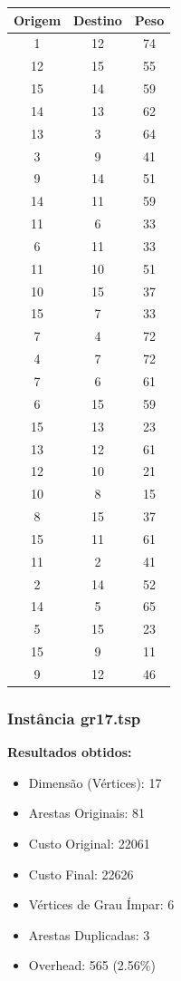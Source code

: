 \documentclass[12pt]{article}
\begin{document}
\begin{longtable}{|c|c|c|}
\hline Origem & Destino & Peso \\
\hline 1 & 12 & 74 \\
\hline 12 & 15 & 55 \\
\hline 15 & 14 & 59 \\
\hline 14 & 13 & 62 \\
\hline 13 & 3 & 64 \\
\hline 3 & 9 & 41 \\
\hline 9 & 14 & 51 \\
\hline 14 & 11 & 59 \\
\hline 11 & 6 & 33 \\
\hline 6 & 11 & 33 \\
\hline 11 & 10 & 51 \\
\hline 10 & 15 & 37 \\
\hline 15 & 7 & 33 \\
\hline 7 & 4 & 72 \\
\hline 4 & 7 & 72 \\
\hline 7 & 6 & 61 \\
\hline 6 & 15 & 59 \\
\hline 15 & 13 & 23 \\
\hline 13 & 12 & 61 \\
\hline 12 & 10 & 21 \\
\hline 10 & 8 & 15 \\
\hline 8 & 15 & 37 \\
\hline 15 & 11 & 61 \\
\hline 11 & 2 & 41 \\
\hline 2 & 14 & 52 \\
\hline 14 & 5 & 65 \\
\hline 5 & 15 & 23 \\
\hline 15 & 9 & 11 \\
\hline 9 & 12 & 46 \\
\hline\end{longtable}

\subsubsection{Instância gr17.tsp}

\textbf{Resultados obtidos:}
\begin{itemize}
    \item Dimensão (Vértices): 17
    \item Arestas Originais: 81
    \item Custo Original: 22061
    \item Custo Final: 22626
    \item Vértices de Grau Ímpar: 6
    \item Arestas Duplicadas: 3
    \item Overhead: 565 (2.56\%)
\end{itemize}
\end{document}
